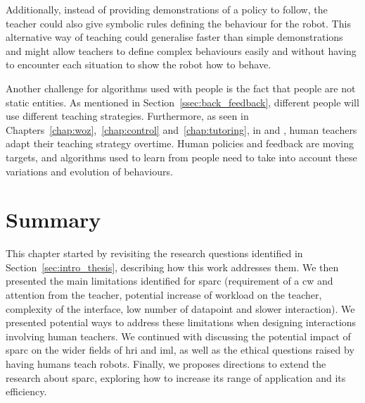 Additionally, instead of providing demonstrations of a policy to follow, the teacher could also give symbolic rules defining the behaviour for the robot. This alternative way of teaching could generalise faster than simple demonstrations and might allow teachers to define complex behaviours easily and without having to encounter each situation to show the robot how to behave. %

Another challenge for algorithms used with people is the fact that people are not static entities. As mentioned in Section~\ref{ssec:back_feedback}, different people will use different teaching strategies. Furthermore, as seen in Chapters~\ref{chap:woz},~\ref{chap:control} and~\ref{chap:tutoring}, in \cite{thomaz2008teachable} and \cite{macglashan2017interactive}, human teachers adapt their teaching strategy overtime. Human policies and feedback are moving targets, and algorithms used to learn from people need to take into account these variations and evolution of behaviours.

\section{Summary} \label{sec:disc_summary}


This chapter started by revisiting the research questions identified in Section~\ref{sec:intro_thesis}, describing how this work addresses them. We then presented the main limitations identified for \gls{sparc} (requirement of a \gls{cw} and attention from the teacher, potential increase of workload on the teacher, complexity of the interface, low number of datapoint and slower interaction). We presented potential ways to address these limitations when designing interactions involving human teachers. We continued with discussing the potential impact of \gls{sparc} on the wider fields of \gls{hri} and \gls{iml}, as well as the ethical questions raised by having humans teach robots. Finally, we proposes directions to extend the research about \gls{sparc}, exploring how to increase its range of application and its efficiency.%
